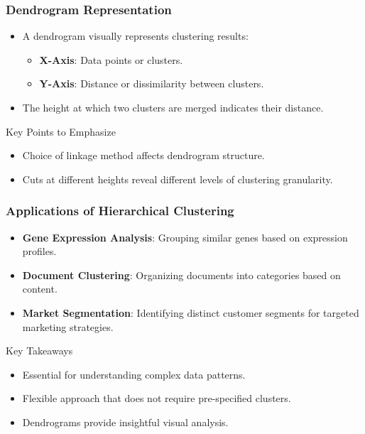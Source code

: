 \documentclass[aspectratio=169]{beamer}
\begin{document}
\begin{frame}[fragile]
    \frametitle{Dendrogram Representation}
    \begin{itemize}
        \item A dendrogram visually represents clustering results:
        \begin{itemize}
            \item \textbf{X-Axis}: Data points or clusters.
            \item \textbf{Y-Axis}: Distance or dissimilarity between clusters.
        \end{itemize}
        \item The height at which two clusters are merged indicates their distance.
    \end{itemize}
    \begin{block}{Key Points to Emphasize}
        \begin{itemize}
            \item Choice of linkage method affects dendrogram structure.
            \item Cuts at different heights reveal different levels of clustering granularity.
        \end{itemize}
    \end{block}
\end{frame}

\begin{frame}[fragile]
    \frametitle{Applications of Hierarchical Clustering}
    \begin{itemize}
        \item \textbf{Gene Expression Analysis}: Grouping similar genes based on expression profiles.
        \item \textbf{Document Clustering}: Organizing documents into categories based on content.
        \item \textbf{Market Segmentation}: Identifying distinct customer segments for targeted marketing strategies.
    \end{itemize}

    \begin{block}{Key Takeaways}
        \begin{itemize}
            \item Essential for understanding complex data patterns.
            \item Flexible approach that does not require pre-specified clusters.
            \item Dendrograms provide insightful visual analysis.
        \end{itemize}
    \end{block}
\end{frame}
\end{document}
